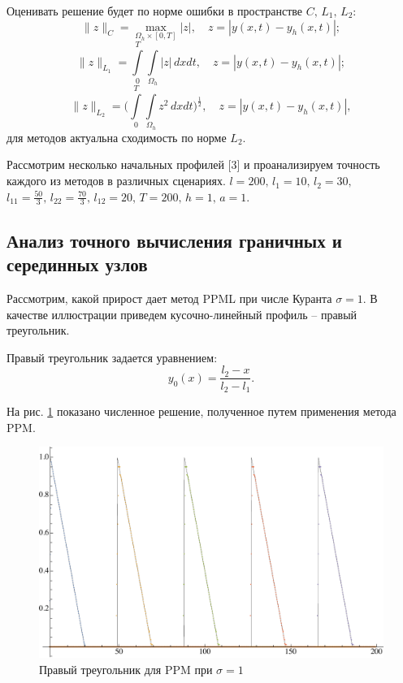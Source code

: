 \documentclass[12pt,a4paper]{article}
\newcommand{\picref}[1]{рис. \ref{#1}}
\begin{document}
    Оценивать решение будет по норме ошибки в пространстве $ C,\, L_1,\, L_2\colon $
    \[
        \|z\|_{C} = \max_{\Omega_h \times [0, T]} |z|, \quad z = |y(x,t)-y_h(x,t)|;
    \]
    \[
        \|z\|_{L_1} = \int\limits_{0}^{T}\int\limits_{\Omega_h} |z|\, dx dt, \quad z = |y(x,t)-y_h(x,t)|;
    \]
    \[
        \|z\|_{L_2} = \Biggl( \int\limits_{0}^{T}\int\limits_{\Omega_h} z^2\, dx dt \Biggr)^{\tfrac{1}{2}}, \quad z = |y(x,t)-y_h(x,t)|,
    \]
    \noindent для методов актуальна сходимость по норме $ L_2 $.

    Рассмотрим несколько начальных профилей [3] и проанализируем точность каждого из методов в различных сценариях. $ l = 200,\, l_1 = 10,\, l_2 = 30,$
    \noindent $ l_{11} = \frac{50}{3},\, l_{22} = \frac{70}{3},\, l_{12} = 20,\, T = 200,\, h = 1,\, a = 1$.

    \subsection{Анализ точного вычисления граничных и серединных узлов }

    Рассмотрим, какой прирост дает метод PPML при числе Куранта $ \sigma = 1 $. В качестве иллюстрации приведем кусочно-линейный профиль -- правый треугольник.

    \pagebreak

    Правый треугольник задается уравнением:
    \[
            y_0(x) = \dfrac{l_2 - x}{l_2 - l_1}.
    \]

    На \picref{fig:ppm_rightTriangle_1} показано численное решение, полученное путем применения метода PPM. 

     \begin{figure}[h]
        \centering
        \includegraphics[width=\textwidth]{sigma=1./advectionPPM_rightTriangle.pdf}
        \caption{Правый треугольник для PPM при $ \sigma = 1 $}
        \label{fig:ppm_rightTriangle_1}
    \end{figure}
\end{document}

